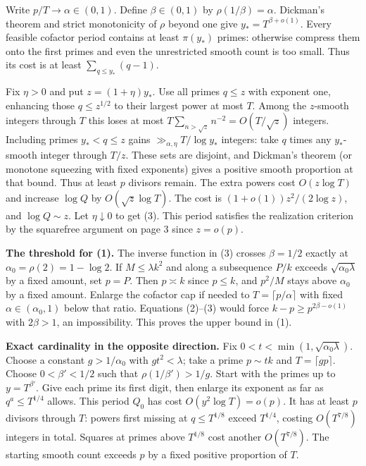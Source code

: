 \documentclass[11pt]{article}
\newcommand{\head}[1]{\par\vspace{5pt}{\large\bfseries #1}\par}
\begin{document}
\newpage
\head{3. Smooth divisors and the size of the excess}
Write $p/T\to\alpha\in(0,1)$. Define $\beta\in(0,1)$ by $\rho(1/\beta)=\alpha$. Dickman's theorem and strict monotonicity of $\rho$ beyond one give $y_*=T^{\beta+o(1)}$. Every feasible cofactor period contains at least $\pi(y_*)$ primes: otherwise compress them onto the first primes and even the unrestricted smooth count is too small. Thus its cost is at least $\sum_{q\le y_*}(q-1)$.

Fix $\eta>0$ and put $z=(1+\eta)y_*$. Use all primes $q\le z$ with exponent one, enhancing those $q\le z^{1/2}$ to their largest power at most $T$. Among the $z$-smooth integers through $T$ this loses at most $T\sum_{n>\sqrt z} n^{-2}=O(T/\sqrt z)$ integers. Including primes $y_*<q\le z$ gains $\gg_{\alpha,\eta}T/\log y_*$ integers: take $q$ times any $y_*$-smooth integer through $T/z$. These sets are disjoint, and Dickman's theorem (or monotone squeezing with fixed exponents) gives a positive smooth proportion at that bound. Thus at least $p$ divisors remain. The extra powers cost $O(z\log T)$ and increase $\log Q$ by $O(\sqrt z\log T)$. The cost is $(1+o(1))z^2/(2\log z)$, and $\log Q\sim z$. Let $\eta\downarrow0$ to get (3). This period satisfies the realization criterion by the squarefree argument on page 3 since $z=o(p)$.

\textbf{The threshold for (1).} The inverse function in (3) crosses $\beta=1/2$ exactly at $\alpha_0=\rho(2)=1-\log2$. If $M\le\lambda k^2$ and along a subsequence $P/k$ exceeds $\sqrt{\alpha_0\lambda}$ by a fixed amount, set $p=P$. Then $p\asymp k$ since $p\le k$, and $p^2/M$ stays above $\alpha_0$ by a fixed amount. Enlarge the cofactor cap if needed to $T=\lceil p/\alpha\rceil$ with fixed $\alpha\in(\alpha_0,1)$ below that ratio. Equations (2)--(3) would force $k-p\ge p^{2\beta-o(1)}$ with $2\beta>1$, an impossibility. This proves the upper bound in (1).

\textbf{Exact cardinality in the opposite direction.} Fix $0<t<\min(1,\sqrt{\alpha_0\lambda})$. Choose a constant $g>1/\alpha_0$ with $gt^2<\lambda$; take a prime $p\sim tk$ and $T=\lceil gp\rceil$. Choose $0<\beta'<1/2$ such that $\rho(1/\beta')>1/g$. Start with the primes up to $y=T^{\beta'}$. Give each prime its first digit, then enlarge its exponent as far as $q^a\le T^{1/4}$ allows. This period $Q_0$ has cost $O(y^2\log T)=o(p)$. It has at least $p$ divisors through $T$: powers first missing at $q\le T^{1/8}$ exceed $T^{1/4}$, costing $O(T^{7/8})$ integers in total. Squares at primes above $T^{1/8}$ cost another $O(T^{7/8})$. The starting smooth count exceeds $p$ by a fixed positive proportion of $T$.
\end{document}
